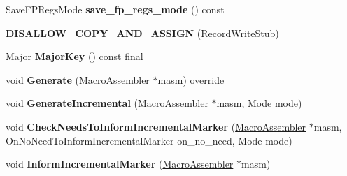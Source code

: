\begin{DoxyCompactItemize}
\item 
Save\+F\+P\+Regs\+Mode {\bfseries save\+\_\+fp\+\_\+regs\+\_\+mode} () const \hypertarget{classv8_1_1internal_1_1_record_write_stub_a958cf062d6f62adc812d2df9b92bd24a}{}\label{classv8_1_1internal_1_1_record_write_stub_a958cf062d6f62adc812d2df9b92bd24a}

\item 
{\bfseries D\+I\+S\+A\+L\+L\+O\+W\+\_\+\+C\+O\+P\+Y\+\_\+\+A\+N\+D\+\_\+\+A\+S\+S\+I\+GN} (\hyperlink{classv8_1_1internal_1_1_record_write_stub}{Record\+Write\+Stub})\hypertarget{classv8_1_1internal_1_1_record_write_stub_ab5fe793d232d0a1fea1b3626df883dd3}{}\label{classv8_1_1internal_1_1_record_write_stub_ab5fe793d232d0a1fea1b3626df883dd3}

\item 
Major {\bfseries Major\+Key} () const  final\hypertarget{classv8_1_1internal_1_1_record_write_stub_aa48ea86c84fbc9af6c238be1b4b8fa8d}{}\label{classv8_1_1internal_1_1_record_write_stub_aa48ea86c84fbc9af6c238be1b4b8fa8d}

\item 
void {\bfseries Generate} (\hyperlink{classv8_1_1internal_1_1_macro_assembler}{Macro\+Assembler} $\ast$masm) override\hypertarget{classv8_1_1internal_1_1_record_write_stub_a71cb55552be288a12876045441a66dca}{}\label{classv8_1_1internal_1_1_record_write_stub_a71cb55552be288a12876045441a66dca}

\item 
void {\bfseries Generate\+Incremental} (\hyperlink{classv8_1_1internal_1_1_macro_assembler}{Macro\+Assembler} $\ast$masm, Mode mode)\hypertarget{classv8_1_1internal_1_1_record_write_stub_a05cf08ed0350334ba02a2e918b42ffcc}{}\label{classv8_1_1internal_1_1_record_write_stub_a05cf08ed0350334ba02a2e918b42ffcc}

\item 
void {\bfseries Check\+Needs\+To\+Inform\+Incremental\+Marker} (\hyperlink{classv8_1_1internal_1_1_macro_assembler}{Macro\+Assembler} $\ast$masm, On\+No\+Need\+To\+Inform\+Incremental\+Marker on\+\_\+no\+\_\+need, Mode mode)\hypertarget{classv8_1_1internal_1_1_record_write_stub_aa80cd82bd6fa0cdc17b5cb2d17540d59}{}\label{classv8_1_1internal_1_1_record_write_stub_aa80cd82bd6fa0cdc17b5cb2d17540d59}

\item 
void {\bfseries Inform\+Incremental\+Marker} (\hyperlink{classv8_1_1internal_1_1_macro_assembler}{Macro\+Assembler} $\ast$masm)\hypertarget{classv8_1_1internal_1_1_record_write_stub_a18e17a353df1617947581e3e6b9e9183}{}\label{classv8_1_1internal_1_1_record_write_stub_a18e17a353df1617947581e3e6b9e9183}


\end{DoxyCompactItemize}
